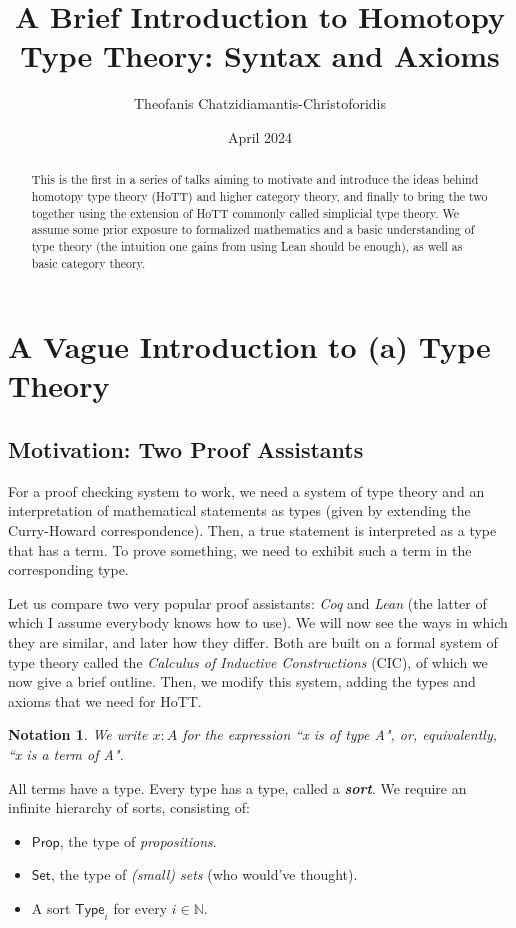 \documentclass{scrartcl}
\title{A Brief Introduction to Homotopy Type Theory: Syntax and Axioms}
\author{Theofanis Chatzidiamantis-Christoforidis}
\date{April 2024}
\newcommand{\textbi}[1]{\textbf{\textit{#1}}}
\newcommand{\bN}{\mathbb{N}}
\newcommand{\tProp}{\mathsf{Prop}}
\newcommand{\tSet}{\mathsf{Set}}
\newcommand{\tType}{\mathsf{Type}}
\newtheorem{nota}[subsection]{Notation}
\begin{document}
\maketitle

\tableofcontents

\begin{abstract}
    This is the first in a series of talks aiming to motivate and introduce the ideas behind homotopy type theory (HoTT) and higher category theory, and finally to bring the two together using the extension of HoTT commonly called simplicial type theory. We assume some prior exposure to formalized mathematics and a basic understanding of type theory (the intuition one gains from using Lean should be enough), as well as basic category theory.
\end{abstract}


\section{A Vague Introduction to (a) Type Theory}

\subsection*{Motivation: Two Proof Assistants}

For a proof checking system to work, we need a system of type theory and an interpretation of mathematical statements as types (given by extending the Curry-Howard correspondence). Then, a true statement is interpreted as a type that has a term. To prove something, we need to exhibit such a term in the corresponding type. 
\par Let us compare two very popular proof assistants: \textit{Coq} and \textit{Lean} (the latter of which I assume everybody knows how to use). We will now see the ways in which they are similar, and later how they differ. Both are built on a formal system of type theory called the \textit{Calculus of Inductive Constructions} (CIC), of which we now give a brief outline. Then, we modify this system, adding the types and axioms that we need for HoTT.

\begin{nota}
    We write $x:A$ for the expression ``x is of type A", or, equivalently, ``x is a term of A".
\end{nota}
All terms have a type. Every type has a type, called a \textbi{sort}. We require an infinite hierarchy of sorts, consisting of:
\begin{itemize}
    \item $\tProp$, the type of \textit{propositions}. 
    \item $\tSet$, the type of \textit{(small) sets} (who would've thought).
    \item A sort $\tType_i$ for every $i\in\bN$. 
\end{itemize}
\end{document}
